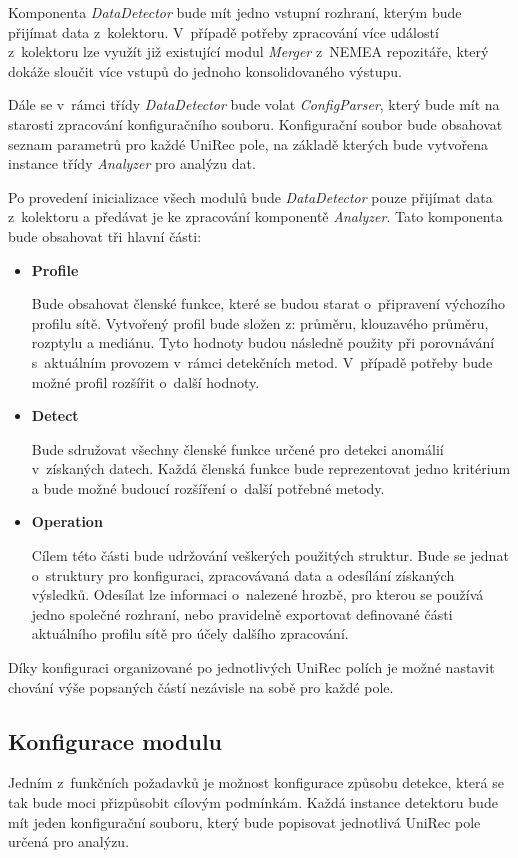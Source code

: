  Komponenta \textit{DataDetector} bude mít jedno vstupní rozhraní, kterým bude přijímat data z~kolektoru.
 V~případě potřeby
 zpracování více událostí z~kolektoru lze využít již existující modul \textit{Merger} z~NEMEA repozitáře, který
 dokáže sloučit více vstupů do jednoho konsolidovaného výstupu. 
 
 Dále se v~rámci třídy \textit{DataDetector} bude volat \textit{ConfigParser}, který bude mít na starosti zpracování 
 konfiguračního souboru. Konfigurační soubor bude obsahovat seznam parametrů pro každé UniRec pole,
 na základě kterých bude vytvořena instance třídy \textit{Analyzer} pro analýzu dat. 
 
 Po provedení inicializace všech modulů bude \textit{DataDetector} pouze přijímat data z~kolektoru a 
 předávat je ke zpracování komponentě \textit{Analyzer}. Tato komponenta bude obsahovat
 tři hlavní části:
 \begin{itemize}
  \item \textbf{Profile}
  
  Bude obsahovat členské funkce, které se budou starat o~připravení výchozího profilu sítě. 
  Vytvořený profil bude složen z: průměru, klouzavého průměru, rozptylu a mediánu.
  Tyto hodnoty budou následně použity při porovnávání s~aktuálním provozem v~rámci detekčních
  metod. V~případě potřeby bude možné profil rozšířit o~další hodnoty.
  
  \item \textbf{Detect}
  
  Bude sdružovat všechny členské funkce určené pro detekci anomálií v~získaných datech. 
  Každá členská funkce bude reprezentovat jedno kritérium a bude možné budoucí rozšíření o~další
  potřebné metody.
  
  \item \textbf{Operation}
  
  Cílem této části bude udržování veškerých použitých struktur. Bude se jednat o~struktury 
  pro konfiguraci, zpracovávaná data a odesílání získaných výsledků. Odesílat lze informaci
o~nalezené hrozbě, pro kterou se používá jedno společné rozhraní, nebo pravidelně exportovat
  definované části aktuálního profilu sítě pro účely dalšího zpracování. 
  
 \end{itemize}

 Díky konfiguraci organizované po jednotlivých UniRec polích je možné nastavit chování výše
 popsaných částí nezávisle na sobě pro každé pole.
 
 \subsection{Konfigurace modulu} \label{config_file}
 Jedním z~funkčních požadavků je možnost konfigurace způsobu detekce, která se tak bude moci přizpůsobit 
 cílovým podmínkám. Každá instance detektoru bude mít jeden konfigurační souboru, který bude 
 popisovat jednotlivá UniRec pole určená pro analýzu.
 
